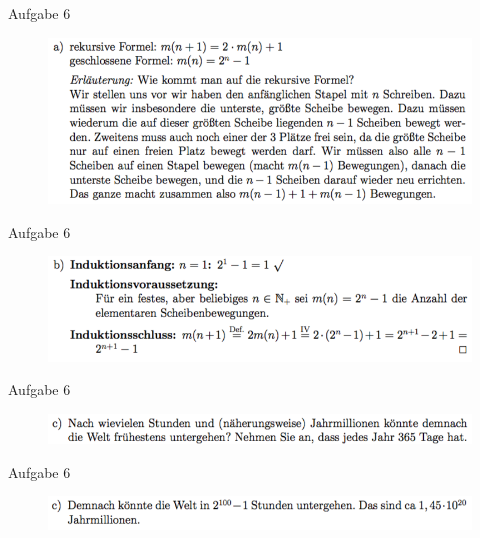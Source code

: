 \begin{frame}{Aufgabe 6}
\begin{figure}[h!]
		\centering
		\includegraphics[width=\textwidth]{../topics/weihnachtstut-aufgaben/14.png} 
	\end{figure}     
\end{frame}

\begin{frame}{Aufgabe 6}
\begin{figure}[h!]
		\centering
		\includegraphics[width=\textwidth]{../topics/weihnachtstut-aufgaben/15.png} 
	\end{figure}     
\end{frame}

\begin{frame}{Aufgabe 6}
\begin{figure}[h!]
		\centering
		\includegraphics[width=\textwidth]{../topics/weihnachtstut-aufgaben/16.png} 
	\end{figure}     
\end{frame}

\begin{frame}{Aufgabe 6}
\begin{figure}[h!]
		\centering
		\includegraphics[width=\textwidth]{../topics/weihnachtstut-aufgaben/17.png} 
	\end{figure}     
\end{frame}

